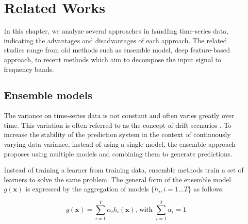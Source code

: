 
\chapter{Related Works}
\label{chap:related_work}

In this chapter, we analyze several approaches in handling time-series data, indicating the advantages and disadvantages of each approach. The related studies range from old methods such as ensemble model, deep feature-based approach, to recent methods which aim to decompose the input signal to frequency bands.

\section{Ensemble models}


The variance on time-series data is not constant and often varies greatly over time. This variation is often referred to as the concept of drift scenarios \cite{liu2025onsitnet}. To increase the stability of the prediction system in the context of continuously varying data variance, instead of using a single model, the ensemble approach proposes using multiple models and combining them to generate predictions.


Instead of training a learner from training data, ensemble methods train a set of learners to solve the same problem. The general form of the ensemble model $g(\mathbf{x})$ is expressed by the aggregation of models $\{h_i, i=1\dots T\}$ as follows:

\begin{equation}
    g(\mathbf{x}) = \sum_{i=1}^T{\alpha_i h_i(\mathbf{x})} \text{, with } \sum_{i=1}^T{\alpha_i}=1
    \label{eq:ensemble}
\end{equation}

